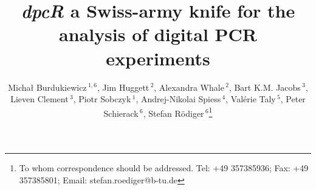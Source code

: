 \documentclass[a4,center,fleqn]{NAR}
\begin{document}
\title{\textit{dpcR} a Swiss-army knife for the analysis of digital PCR experiments}

\author{%
Micha\l{} Burdukiewicz\,$^{1,6}$,
Jim Huggett\,$^{2}$,
Alexandra Whale\,$^{2}$,
Bart K.M. Jacobs\,$^{3}$,
Lieven Clement\,$^{3}$,
Piotr Sobczyk\,$^{1}$,
Andrej-Nikolai Spiess\,$^{4}$,
Val\'{e}rie Taly\,$^{5}$,
Peter Schierack\,$^{6}$,
Stefan R\"odiger\,$^{6}$\footnote{To whom correspondence should be addressed.
Tel: +49 357385936; Fax: +49 357385801; Email: stefan.roediger@b-tu.de}}

\address{%
$^{1}$Department of Genomics, Faculty of Biotechnology, University of Wroc\l{}aw, Wroc\l{}aw, Poland
and
$^{2}$Molecular and Cell Biology Team, LGC, Teddington, United Kingdom
and
$^{3}$Department of Applied Mathematics, Computer Science and Statistics, Ghent University, Belgium
and
$^{4}$University Medical Center Hamburg-Eppendorf, Hamburg, Germany
and
$^{5}$Universit\'{e} Paris Sorbonne Cit\'{e}, Paris, France
and
$^{6}$Faculty of Natural Sciences, Brandenburg University of Technology Cottbus--Senftenberg, Gro\ss{}enhainer Str. 57, 01968, Senftenberg, Germany
}


\maketitle
\end{document}
